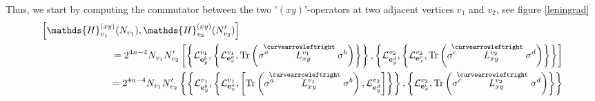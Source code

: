\documentclass[12pt]{article}
\newcommand{\nn}{\nonumber}
\def\cl{{\cal L}}
\begin{document}
\begin{appendix}
Thus, we start by computing the commutator between the two '$(xy)$'-operators at two adjacent vertices $v_1$ and $v_2$, see figure \ref{leningrad}
\begin{eqnarray}
\left[\mathds{H}^{(xy)}_{v_1}(N_{v_1}),\mathds{H}^{(xy)}_{v_2}(N'_{v_2})\right] &&\nn\\
&&\hspace{-5cm} = 2^{4n-4}N_{v_1}N'_{v_2} 
\left[
\left\{ \cl^{v_1}_{{\bf e}^b_y} , \left\{ \cl^{v_1}_{{\bf e}^a_x}  , \mbox{Tr} \left( \sigma^a  \stackrel{\hspace{-3mm}\curvearrowleftright}{L^{v_1}_{xy}}       \sigma^b   \right) \right\} \right\}
,
\left\{ \cl^{v_2}_{{\bf e}^d_y} , \left\{ \cl^{v_2}_{{\bf e}^c_x}  , \mbox{Tr} \left( \sigma^c  \stackrel{\hspace{-3mm}\curvearrowleftright}{L^{v_2}_{xy}}       \sigma^d   \right) \right\} \right\}
\right]
\nn\\
&&\hspace{-5cm} = 2^{4n-4}N_{v_1}N'_{v_2} 
\left\{ \left\{ \cl^{v_1}_{{\bf e}^b_y} , \left\{ \cl^{v_1}_{{\bf e}^a_x}  , \left[ \mbox{Tr} \left( \sigma^a  \stackrel{\hspace{-3mm}\curvearrowleftright}{L^{v_1}_{xy}}       \sigma^b   \right), \cl^{v_2}_{{\bf e}^d_y} \right] \right\} \right\}
 , \left\{ \cl^{v_2}_{{\bf e}^c_x}  , \mbox{Tr} \left( \sigma^c  \stackrel{\hspace{-3mm}\curvearrowleftright}{L^{v_2}_{xy}}       \sigma^d   \right) \right\} \right\}

\end{eqnarray}
\end{appendix}
\end{document}
